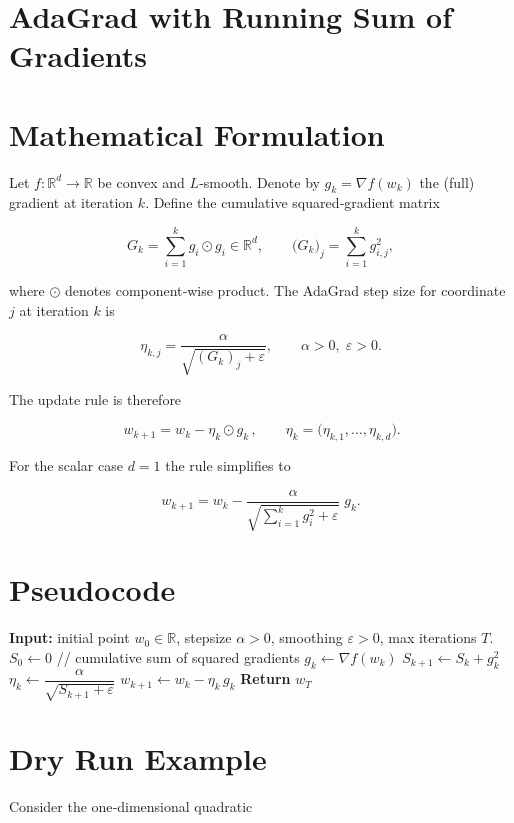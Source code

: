 \documentclass{article}
\begin{document}
\section*{AdaGrad with Running Sum of Gradients}

\section*{Mathematical Formulation}
Let $f:\mathbb{R}^{d}\rightarrow\mathbb{R}$ be convex and $L$‑smooth.  
Denote by $g_{k}= \nabla f(w_{k})$ the (full) gradient at iteration $k$.  
Define the cumulative squared‑gradient matrix  

\[
G_{k}= \sum_{i=1}^{k} g_{i}\odot g_{i}\in\mathbb{R}^{d},
\qquad
\bigl(G_{k}\bigr)_{j}= \sum_{i=1}^{k} g_{i,j}^{2},
\]

where $\odot$ denotes component‑wise product.  
The AdaGrad step size for coordinate $j$ at iteration $k$ is  

\[
\eta_{k,j}= \frac{\alpha}{\sqrt{(G_{k})_{j}+\varepsilon}},\qquad 
\alpha>0,\;\varepsilon>0.
\]

The update rule is therefore  

\[
\boxed{\,w_{k+1}= w_{k}-\eta_{k}\odot g_{k}\,},\qquad 
\eta_{k}= \bigl(\eta_{k,1},\dots,\eta_{k,d}\bigr).
\]

For the scalar case $d=1$ the rule simplifies to  

\[
w_{k+1}= w_{k}-\frac{\alpha}{\sqrt{\sum_{i=1}^{k} g_{i}^{2}+\varepsilon}}\;g_{k}.
\]

\section*{Pseudocode}
\begin{algorithm}[H]
\caption{AdaGrad (scalar version)}
\begin{algorithmic}[1]
\STATE \textbf{Input:} initial point $w_{0}\in\mathbb{R}$, stepsize $\alpha>0$, smoothing $\varepsilon>0$, max iterations $T$.
\STATE $S_{0}\leftarrow 0$ \hfill // cumulative sum of squared gradients
    \STATE $g_{k}\leftarrow \nabla f(w_{k})$
    \STATE $S_{k+1}\leftarrow S_{k}+g_{k}^{2}$
    \STATE $\eta_{k}\leftarrow \dfrac{\alpha}{\sqrt{S_{k+1}+\varepsilon}}$
    \STATE $w_{k+1}\leftarrow w_{k}-\eta_{k}\,g_{k}$
\ENDFOR
\STATE \textbf{Return} $w_{T}$
\end{algorithmic}
\end{algorithm}

\section*{Dry Run Example}
Consider the one‑dimensional quadratic  
\end{document}
